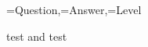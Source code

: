 \documentclass{article}
\newcounter{maxleveli}
\newcounter{maxlevelii}
\newcounter{leveli}
\newcounter{levelii}
\begin{document}
\begin{enumerate}
  {\Question=Question,\Answer=Answer,\Level=Level}%
  {%
    \ifnumgreater
      {\value{level\romannumeral\Level}}%
      {\value{maxlevel\romannumeral\Level}}%
    {}%
    {\item \Question

     \ifdefempty\Answer
     {}%
     {%
       \iftoggle{showanswers}{Answer: \Answer}{}%
     }%
    }%
    \ifboolexpr
    {%
      test{\ifnumgreater
      {\value{leveli}}%
      {\value{maxleveli}}}%
      and
      test{\ifnumgreater
      {\value{levelii}}%
      {\value{maxlevelii}}}%
    }%
    {\dtlbreak}{}%
  }
\end{enumerate}
\end{document}
